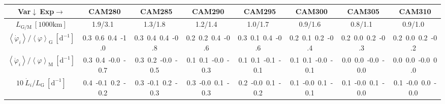 \setlength\tabcolsep{1.5pt}

\begin{table}[H]
{\footnotesize
\begin{centering}
\begin{tabular}{|c|c|c|c|c|c|c|c|}
\hline
Var$\downarrow\ $Exp$\rightarrow$ & CAM280 & CAM285 & CAM290 & CAM295 & CAM300 & CAM305 & CAM310 \tabularnewline
\hline
\hline
$L_{\mathrm{G/M}}\ \left[1000\mathrm{km}\right]$ & 1.9/3.1\ & 1.3/1.8\ & 1.2/1.4\ & 1.0/1.7\ & 0.9/1.6\ & 0.8/1.1\ & 0.9/1.0\ \tabularnewline
\hline
$\left\langle \dot{\varphi}_{i}\right\rangle /\left\langle \varphi\right\rangle _{\mathrm{G}}\ \left[\mathrm{d^{-1}}\right]$ & \textcolor{C1}{0.3}\ \textcolor{C2}{0.6}\ \textcolor{C3}{0.4}\ \textcolor{C4}{-1.0}\  & \textcolor{C1}{0.3}\ \textcolor{C2}{0.4}\ \textcolor{C3}{0.4}\ \textcolor{C4}{-0.8}\  & \textcolor{C1}{0.2}\ \textcolor{C2}{0.2}\ \textcolor{C3}{0.4}\ \textcolor{C4}{-0.6}\  & \textcolor{C1}{0.3}\ \textcolor{C2}{0.1}\ \textcolor{C3}{0.4}\ \textcolor{C4}{-0.6}\  & \textcolor{C1}{0.2}\ \textcolor{C2}{0.1}\ \textcolor{C3}{0.2}\ \textcolor{C4}{-0.4}\  & \textcolor{C1}{0.2}\ \textcolor{C2}{0.0}\ \textcolor{C3}{0.2}\ \textcolor{C4}{-0.3}\  & \textcolor{C1}{0.2}\ \textcolor{C2}{0.0}\ \textcolor{C3}{0.2}\ \textcolor{C4}{-0.2}\  \tabularnewline
\hline
$\left\langle \dot{\varphi}_{i}\right\rangle /\left\langle \varphi\right\rangle _{\mathrm{M}}\ \left[\mathrm{d^{-1}}\right]$ & \textcolor{C1}{0.3}\ \textcolor{C2}{0.4}\ \textcolor{C3}{-0.0}\ \textcolor{C4}{-0.7}\  & \textcolor{C1}{0.3}\ \textcolor{C2}{0.2}\ \textcolor{C3}{-0.0}\ \textcolor{C4}{-0.5}\  & \textcolor{C1}{0.1}\ \textcolor{C2}{0.1}\ \textcolor{C3}{-0.0}\ \textcolor{C4}{-0.3}\  & \textcolor{C1}{0.1}\ \textcolor{C2}{0.1}\ \textcolor{C3}{-0.1}\ \textcolor{C4}{-0.1}\  & \textcolor{C1}{0.1}\ \textcolor{C2}{0.1}\ \textcolor{C3}{-0.0}\ \textcolor{C4}{-0.1}\  & \textcolor{C1}{0.0}\ \textcolor{C2}{0.0}\ \textcolor{C3}{-0.0}\ \textcolor{C4}{-0.0}\  & \textcolor{C1}{0.0}\ \textcolor{C2}{0.0}\ \textcolor{C3}{-0.0}\ \textcolor{C4}{0.0}\  \tabularnewline
\hline
$10\ \dot{L}_{i}/L_{\mathrm{G}}\ \left[\mathrm{d^{-1}}\right]$ & \textcolor{C1}{0.4}\ \textcolor{C2}{-0.1}\ \textcolor{C3}{0.2}\ \textcolor{C4}{-0.2}\  & \textcolor{C1}{0.3}\ \textcolor{C2}{-0.1}\ \textcolor{C3}{0.2}\ \textcolor{C4}{-0.3}\  & \textcolor{C1}{0.3}\ \textcolor{C2}{-0.0}\ \textcolor{C3}{0.1}\ \textcolor{C4}{-0.3}\  & \textcolor{C1}{0.2}\ \textcolor{C2}{-0.0}\ \textcolor{C3}{0.1}\ \textcolor{C4}{-0.2}\  & \textcolor{C1}{0.1}\ \textcolor{C2}{-0.0}\ \textcolor{C3}{0.1}\ \textcolor{C4}{-0.1}\  & \textcolor{C1}{0.1}\ \textcolor{C2}{-0.0}\ \textcolor{C3}{0.1}\ \textcolor{C4}{-0.0}\  & \textcolor{C1}{0.1}\ \textcolor{C2}{-0.0}\ \textcolor{C3}{0.0}\ \textcolor{C4}{-0.0}\  \tabularnewline

\end{tabular}
\end{centering}}
\end{table}
